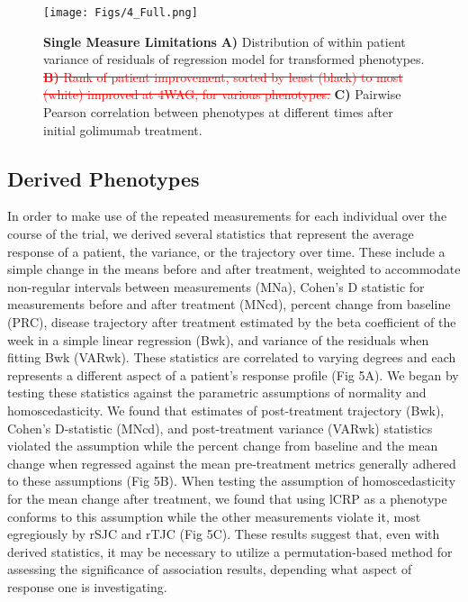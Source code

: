 \begin{figure}[h!]
  \centering
  \texttt{[image: Figs/4\_Full.png]}
  \caption{ {\bf Single Measure Limitations} {\bf A)} Distribution of within patient variance of residuals of regression model for transformed phenotypes. \textcolor{red}{\st{{\bf B)} Rank of patient improvement, sorted by least (black) to most (white) improved at 4WAG, for various phenotypes.}} {\bf C)} Pairwise Pearson correlation between phenotypes at different times after initial golimumab treatment. }
  \label{FIG_4}
\end{figure}


\subsection{Derived Phenotypes}

In order to make use of the repeated measurements for each individual over the course of the trial, we derived several statistics that represent the average response of a patient, the variance, or the trajectory over time. These include a simple change in the means before and after treatment, weighted to accommodate non-regular intervals between measurements (MNa), Cohen’s D statistic for measurements before and after treatment (MNcd), percent change from baseline (PRC), disease trajectory after treatment estimated by the beta coefficient of the week in a simple linear regression (Bwk), and variance of the residuals when fitting Bwk (VARwk). These statistics are correlated to varying degrees and each represents a different aspect of a patient’s response profile (Fig 5A). We began by testing these statistics against the parametric assumptions of normality and homoscedasticity. We found that estimates of post-treatment trajectory (Bwk), Cohen’s D-statistic (MNcd), and post-treatment variance (VARwk) statistics violated the assumption while the percent change from baseline and the mean change when regressed against the mean pre-treatment metrics generally adhered to these assumptions (Fig 5B). When testing the assumption of homoscedasticity for the mean change after treatment, we found that using lCRP as a phenotype conforms to this assumption while the other measurements violate it, most egregiously by rSJC and rTJC (Fig 5C). These results suggest that, even with derived statistics, it may be necessary to utilize a permutation-based method for assessing the significance of association results, depending what aspect of response one is investigating.

